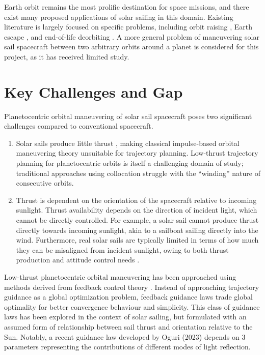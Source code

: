 Earth orbit remains the most prolific destination for space missions, and there exist many proposed applications of solar sailing in this domain. Existing literature is largely focused on specific problems, including orbit raising \cite{fieseler1998method}, Earth escape \cite{coverstone2003technique}, and end-of-life deorbiting \cite{lappas2011deorbitsail}. A more general problem of maneuvering solar sail spacecraft between two arbitrary orbits around a planet is considered for this project, as it has received limited study.

\section{Key Challenges and Gap}
Planetocentric orbital maneuvering of solar sail spacecraft poses two significant challenges compared to conventional spacecraft.
\begin{enumerate}
    \item Solar sails produce little thrust \cite{mcinnes}, making classical impulse-based orbital maneuvering theory unsuitable for trajectory planning. Low-thrust trajectory planning for planetocentric orbits is itself a challenging domain of study; traditional approaches using collocation struggle with the ``winding'' nature of consecutive orbits.
    \item Thrust is dependent on the orientation of the spacecraft relative to incoming sunlight. Thrust availability depends on the direction of incident light, which cannot be directly controlled. For example, a solar sail cannot produce thrust directly towards incoming sunlight, akin to a sailboat sailing directly into the wind. Furthermore, real solar sails are typically limited in terms of how much they can be misaligned from incident sunlight, owing to both thrust production and attitude control needs \cite{mcinnes}.
\end{enumerate}

Low-thrust planetocentric orbital maneuvering has been approached using methods derived from feedback control theory \cite{ilgen1994low, petropoulos2004low, vargaperez2016, sanjeev2023}. Instead of approaching trajectory guidance as a global optimization problem, feedback guidance laws trade global optimality for better convergence behaviour and simplicity. This class of guidance laws has been explored in the context of solar sailing, but formulated with an assumed form of relationship between sail thrust and orientation relative to the Sun. Notably, a recent guidance law developed by Oguri (2023) \cite{oguri2023solar} depends on 3 parameters representing the contributions of different modes of light reflection.

